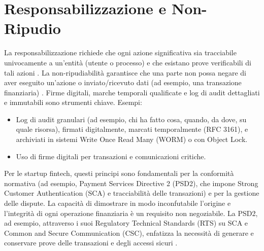 \section{Responsabilizzazione e Non-Ripudio}
La responsabilizzazione richiede che ogni azione significativa sia tracciabile univocamente a un'entità (utente o processo) e che esistano prove verificabili di tali azioni \cite{Feigenbaum_2020_Accountability}. La non-ripudiabilità garantisce che una parte non possa negare di aver eseguito un'azione o inviato/ricevuto dati (ad esempio, una transazione finanziaria) \cite{NIST_Glossary_NonRepudiation}. Firme digitali, marche temporali qualificate e log di audit dettagliati e immutabili sono strumenti chiave.
Esempi:
\begin{itemize}
\item Log di audit granulari (ad esempio, chi ha fatto cosa, quando, da dove, su quale risorsa), firmati digitalmente, marcati temporalmente (RFC 3161), e archiviati in sistemi Write Once Read Many (WORM) o con Object Lock.
\item Uso di firme digitali per transazioni e comunicazioni critiche.
\end{itemize}
Per le startup fintech, questi principi sono fondamentali per la conformità normativa (ad esempio, Payment Services Directive 2 (PSD2), che impone Strong Customer Authentication (SCA) e tracciabilità delle transazioni) e per la gestione delle dispute. La capacità di dimostrare in modo inconfutabile l'origine e l'integrità di ogni operazione finanziaria è un requisito non negoziabile. La PSD2, ad esempio, attraverso i suoi Regulatory Technical Standards (RTS) su SCA e Common and Secure Communication (CSC), enfatizza la necessità di generare e conservare prove delle transazioni e degli accessi sicuri \cite{EBA_RTS_SCA_CSC}.

